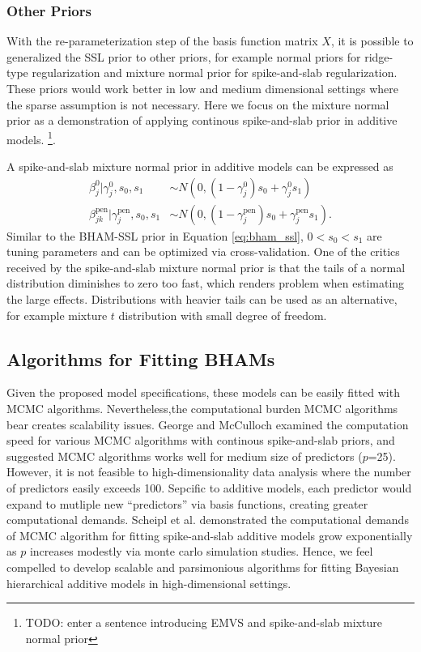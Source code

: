 \documentclass[AMA,STIX1COL,]{WileyNJD-v2}
\begin{document}
\hypertarget{other-priors}{%
\subsubsection{Other Priors}\label{other-priors}}

With the re-parameterization step of the basis function matrix \(X\), it
is possible to generalized the SSL prior to other priors, for example
normal priors for ridge-type regularization and mixture normal prior for
spike-and-slab regularization. These priors would work better in low and
medium dimensional settings where the sparse assumption is not
necessary. Here we focus on the mixture normal prior as a demonstration
of applying continous spike-and-slab prior in additive models.
\footnote{TODO: enter a sentence introducing EMVS and spike-and-slab
  mixture normal prior}.

A spike-and-slab mixture normal prior in additive models can be
expressed as \[
\begin{aligned}
  \beta^0_{j} |\gamma^0_{j},s_0,s_1 &\sim N(0,(1-\gamma^0_{j}) s_0 + \gamma^0_{j} s_1)\nonumber\\
  \beta^\text{pen}_{jk} | \gamma^\text{pen}_{j},s_0,s_1 &\sim N(0,(1-\gamma^\text{pen}_{j}) s_0 + \gamma^\text{pen}_{j} s_1).
\end{aligned}
\] Similar to the BHAM-SSL prior in Equation \ref{eq:bham_ssl},
\(0 < s_0 < s_1\) are tuning parameters and can be optimized via
cross-validation. One of the critics received by the spike-and-slab
mixture normal prior is that the tails of a normal distribution
diminishes to zero too fast, which renders problem when estimating the
large effects. Distributions with heavier tails can be used as an
alternative, for example mixture \(t\) distribution with small degree of
freedom.

\hypertarget{algorithms-for-fitting-bhams}{%
\subsection{Algorithms for Fitting
BHAMs}\label{algorithms-for-fitting-bhams}}

Given the proposed model specifications, these models can be easily
fitted with MCMC algorithms. Nevertheless,the computational burden MCMC
algorithms bear creates scalability issues. George and
McCulloch\citep{George1997} examined the computation speed for various
MCMC algorithms with continous spike-and-slab priors, and suggested MCMC
algorithms works well for medium size of predictors (\(p\)=25). However,
it is not feasible to high-dimensionality data analysis where the number
of predictors easily exceeds 100. Sepcific to additive models, each
predictor would expand to mutliple new ``predictors'' via basis
functions, creating greater computational demands. Scheipl et al.
\citep{Scheipl2013} demonstrated the computational demands of MCMC
algorithm for fitting spike-and-slab additive models grow exponentially
as \(p\) increases modestly via monte carlo simulation studies. Hence,
we feel compelled to develop scalable and parsimonious algorithms for
fitting Bayesian hierarchical additive models in high-dimensional
settings.
\end{document}
